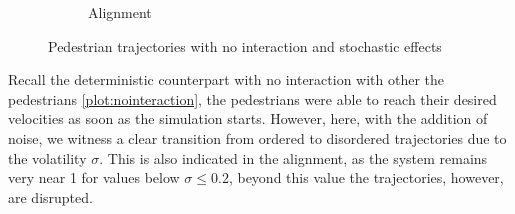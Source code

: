 \begin{itemize}
\begin{figure}[H]
\begin{subfigure}{.49\textwidth}
            \caption{Alignment}
            \label{plot:stoc_nointeraction_alignment}
        \end{subfigure}
        \caption{Pedestrian trajectories with no interaction and stochastic effects}
        \label{plot:stoc_nointeraction}
    \end{figure}
Recall the deterministic counterpart with no interaction with other the pedestrians \autoref{plot:nointeraction}, the pedestrians were able to reach their desired velocities as soon as the simulation starts. However, here, with the addition of noise, we witness a clear transition from ordered to disordered trajectories due to the volatility $\sigma$. This is also indicated in the alignment, as the system remains very near 1 for values below $\sigma \leq 0.2$, beyond this value the trajectories, however, are disrupted. 


\end{itemize}
